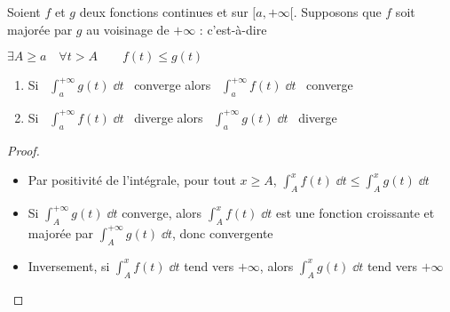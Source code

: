 \begin{frame}

\begin{theoreme}[de comparaison]
\label{th:comparaisonintegrales1}
\pause
Soient $f$ et $g$ deux fonctions continues et  sur
$[a,+\infty[$. Supposons que $f$ soit majorée par $g$ au voisinage de
$+\infty$ : c'est-à-dire \\
\centerline{$\exists A\ge a \quad \forall t>A \qquad f(t)\le g(t)$}
\pause
\begin{enumerate}
  \item Si \  $\int_a^{+\infty} g(t)\;\dd t$ \ converge alors \  $\int_a^{+\infty} f(t)\;\dd t$ \  converge
\pause
  \item Si \  $\int_a^{+\infty} f(t)\;\dd t$ \  diverge alors \  $\int_a^{+\infty} g(t)\;\dd t$ \  diverge
\end{enumerate}
\end{theoreme}

\pause
\medskip

\begin{proof}
\begin{itemize}
  \item Par positivité de l'intégrale, pour tout $x \ge A$,
$\int_A^x f(t)\;\dd t \le \int_A^x g(t)\;\dd t$
\pause
  \item Si $\int_A^{+\infty} g(t)\;\dd t$ converge, alors $\int_A^x f(t)\;\dd t$ est
une fonction croissante et majorée par $\int_A^{+\infty} g(t)\;\dd t$,
donc convergente
\pause
  \item Inversement, si $\int_A^{x} f(t)\;\dd t$ tend vers
$+\infty$, alors $\int_A^{x} g(t)\;\dd t$ tend vers $+\infty$
\qedhere
\end{itemize}
\end{proof}

\end{frame}


